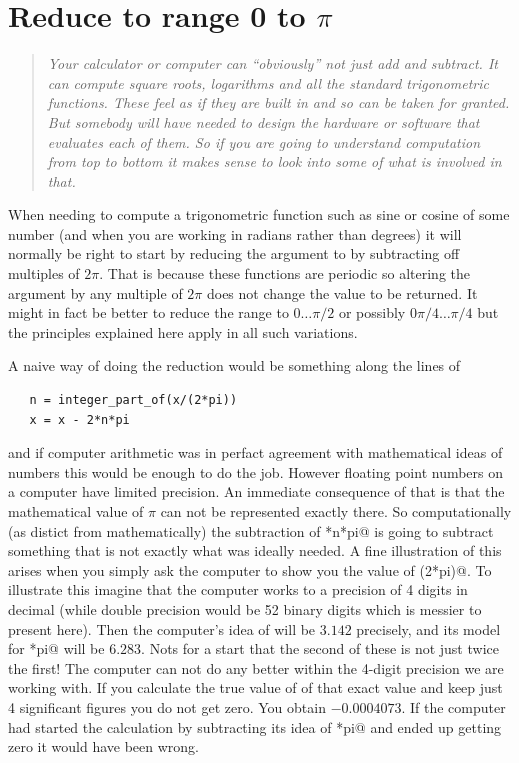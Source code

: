 \section{Reduce to range 0 to $\pi$}
\begin{quotation}\textit{
Your calculator or computer can ``obviously'' not just add and subtract.
It can compute square roots, logarithms and all the standard trigonometric
functions. These feel as if they are built in and so can be taken for granted.
But somebody will have needed to design the hardware or software that
evaluates each of them. So if you are going to understand computation from
top to bottom it makes sense to look into some of what is involved in that.
}\end{quotation}
When needing to compute a trigonometric function such as sine or cosine
of some number (and when you are working in radians rather than degrees)
it will normally be right to start by reducing the argument to by
subtracting off multiples of $2 \pi$. That is because these functions are
periodic so altering the argument by any multiple of $2 \pi$ does not
change the value to be returned. It might in fact be better to reduce
the range to $0 \ldots \pi/2$ or possibly $0\pi/4 \ldots \pi/4$
but the principles explained here apply in all such variations.

A naive way of doing the reduction would be something along the lines of
\begin{verbatim}
   n = integer_part_of(x/(2*pi))
   x = x - 2*n*pi
\end{verbatim}
and if computer arithmetic was in perfact agreement with mathematical ideas
of numbers this would be enough to do the job. However floating point
numbers on a computer have limited precision. An immediate consequence
of that is that the mathematical value of $\pi$ can not be represented
exactly there. So computationally (as distict from mathematically) the
subtraction of *n*pi@ is going to subtract something that is not
exactly what was ideally needed. A fine illustration of this arises when
you simply ask the computer to show you the value of \verb@sin(2*pi)@. To
illustrate this imagine that the computer works to a precision of 4 digits
in decimal (while double precision would be 52 binary digits which is
messier to present here). Then the computer's idea of \verb@pi@ will
be $3.142$ precisely, and its model for *pi@
will be $6.283$. Nots for a start that the second of these is
not just twice the first! The computer can not do any better within the
4-digit precision we are working with. If you calculate the true
value of \verb@sin@ of that exact value and keep just 4 significant figures
you do not get zero. You obtain $-0.0004073$. If the computer had started the
calculation by subtracting its idea of *pi@ and ended up getting zero
it would have been wrong.

